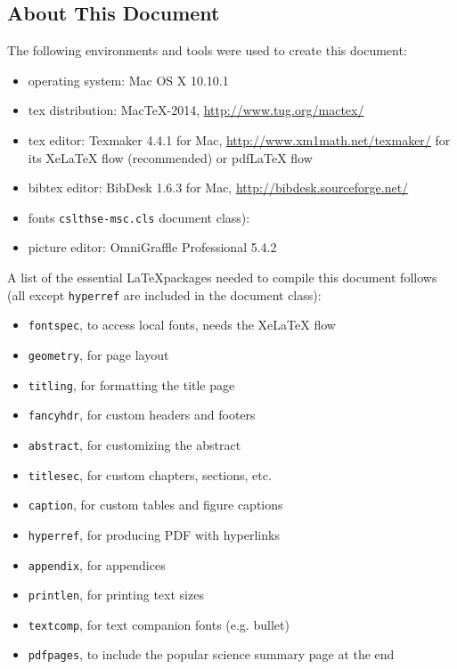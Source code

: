 \documentclass{cslthse-msc}
\begin{document}
\begin{appendices}
\chapter{About This Document}
The following environments and tools were used to create this document:
\begin{itemize}
\item operating system: Mac OS X 10.10.1
\item tex distribution: MacTeX-2014, \url{http://www.tug.org/mactex/}
\item tex editor: Texmaker 4.4.1 for Mac, \url{http://www.xm1math.net/texmaker/} for its XeLaTeX flow (recommended) or pdfLaTeX flow
\item bibtex editor: BibDesk 1.6.3 for Mac, \url{http://bibdesk.sourceforge.net/}
\item fonts \texttt{cslthse-msc.cls} document class): 
\item picture editor: OmniGraffle Professional 5.4.2
\end{itemize}

\noindent A list of the essential \LaTeX packages needed to compile this document follows (all except \texttt{hyperref} are included in the document class):
\begin{itemize}
\item \texttt{fontspec}, to access local fonts, needs the XeLaTeX flow
\item \texttt{geometry}, for page layout
\item \texttt{titling}, for formatting the title page
\item \texttt{fancyhdr}, for custom headers and footers
\item \texttt{abstract}, for customizing the abstract
\item \texttt{titlesec}, for custom chapters, sections, etc.
\item \texttt{caption}, for custom tables and figure captions
\item \texttt{hyperref}, for producing PDF with hyperlinks
\item \texttt{appendix}, for appendices
\item \texttt{printlen}, for printing text sizes
\item \texttt{textcomp}, for text companion fonts (e.g. bullet)
\item \texttt{pdfpages}, to include the popular science summary page at the end
\end{itemize}


\end{appendices}
\end{document}
